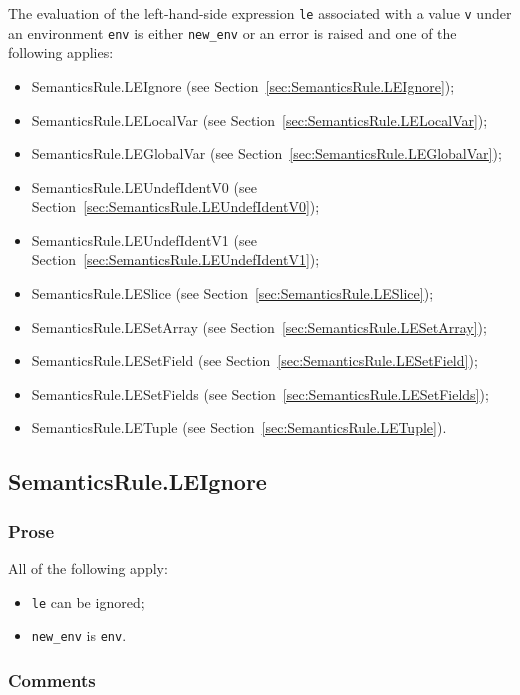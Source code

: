 \documentclass{book}
\begin{document}
The evaluation of the left-hand-side expression \texttt{le} associated with a
value \texttt{v} under an environment \texttt{env} is either \texttt{new\_env}
or an error is raised and one of the following applies:
\begin{itemize}
\item SemanticsRule.LEIgnore (see Section~\ref{sec:SemanticsRule.LEIgnore});
\item SemanticsRule.LELocalVar (see Section~\ref{sec:SemanticsRule.LELocalVar});
\item SemanticsRule.LEGlobalVar (see Section~\ref{sec:SemanticsRule.LEGlobalVar});
\item SemanticsRule.LEUndefIdentV0 (see Section~\ref{sec:SemanticsRule.LEUndefIdentV0});
\item SemanticsRule.LEUndefIdentV1 (see Section~\ref{sec:SemanticsRule.LEUndefIdentV1});
\item SemanticsRule.LESlice (see Section~\ref{sec:SemanticsRule.LESlice});
\item SemanticsRule.LESetArray (see Section~\ref{sec:SemanticsRule.LESetArray});
\item SemanticsRule.LESetField (see Section~\ref{sec:SemanticsRule.LESetField});
\item SemanticsRule.LESetFields (see Section~\ref{sec:SemanticsRule.LESetFields});
\item SemanticsRule.LETuple (see Section~\ref{sec:SemanticsRule.LETuple}).
\end{itemize}

\subsection{SemanticsRule.LEIgnore \label{sec:SemanticsRule.LEIgnore}}

    \subsubsection{Prose}
    All of the following apply:
    \begin{itemize}
    \item \texttt{le} can be ignored;
    \item \texttt{new\_env} is \texttt{env}.
    \end{itemize}

  \subsubsection{Comments}
\end{document}
